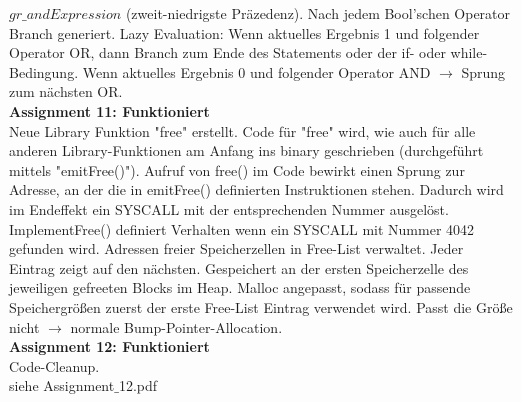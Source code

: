 \documentclass[10pt, a4paper]{article}
\begin{document}
$gr\_andExpression$ (zweit-niedrigste Präzedenz). Nach jedem Bool'schen Operator Branch generiert. Lazy Evaluation: Wenn aktuelles Ergebnis 1 und folgender Operator OR, dann Branch zum Ende des Statements oder der if- oder while-Bedingung. Wenn aktuelles Ergebnis 0 und folgender Operator AND $\rightarrow$ Sprung zum nächsten OR.
\\
\textbf{Assignment 11: Funktioniert}\\
Neue Library Funktion "free" erstellt. Code für "free" wird, wie auch für alle anderen Library-Funktionen am Anfang ins binary geschrieben (durchgeführt mittels "emitFree()"). Aufruf von free() im Code bewirkt einen Sprung zur Adresse, an der die in emitFree() definierten Instruktionen stehen. Dadurch wird im Endeffekt ein SYSCALL mit der entsprechenden Nummer ausgelöst. ImplementFree() definiert Verhalten wenn ein SYSCALL mit Nummer 4042 gefunden wird. Adressen freier Speicherzellen in Free-List verwaltet. Jeder Eintrag zeigt auf den nächsten. Gespeichert an der ersten Speicherzelle des jeweiligen gefreeten Blocks im Heap. Malloc angepasst, sodass für passende Speichergrößen zuerst der erste Free-List Eintrag verwendet wird. Passt die Größe nicht $\rightarrow$ normale Bump-Pointer-Allocation.
\\
\textbf{Assignment 12: Funktioniert}\\
Code-Cleanup.\\
siehe Assignment$\_$12.pdf
\end{document}
